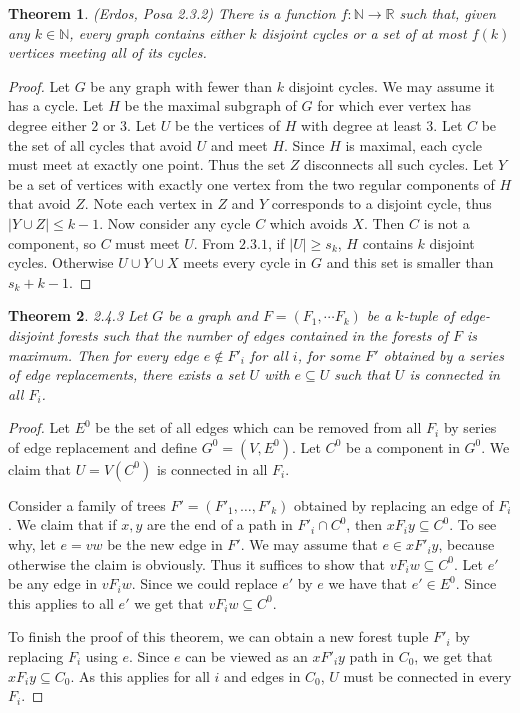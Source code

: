 \documentclass[12pt]{article}
\newtheorem{theorem}{Theorem}
\begin{document}
\begin{theorem} (Erdos, Posa 2.3.2) There is a function
  $f: \mathbb{N} \to \mathbb{R}$ such that, given any
  $k \in \mathbb{N}$, every graph contains either $k$ disjoint cycles
  or a set of at most $f(k)$ vertices meeting all of its cycles.
\end{theorem}
\begin{proof} Let $G$ be any graph with fewer than $k$ disjoint
  cycles. We may assume it has a cycle. Let $H$ be the maximal
  subgraph of $G$ for which ever vertex has degree either $2$ or
  $3$. Let $U$ be the vertices of $H$ with degree at least $3$. Let
  $C$ be the set of all cycles that avoid $U$ and meet $H$. Since $H$
  is maximal, each cycle must meet at exactly one point. Thus the set
  $Z$ disconnects all such cycles. Let $Y$ be a set of vertices with
  exactly one vertex from the two regular components of $H$ that avoid
  $Z$. Note each vertex in $Z$ and $Y$ corresponds to a disjoint
  cycle, thus $|Y \cup Z| \leq k - 1$. Now consider any cycle $C$
  which avoids $X$. Then $C$ is not a component, so $C$ must meet
  $U$. From $2.3.1$, if $|U| \geq s_k$, $H$ contains $k$ disjoint
  cycles. Otherwise $U \cup Y \cup X$ meets every cycle in $G$ and
  this set is smaller than $s_k + k - 1$.
\end{proof}

\begin{theorem}{2.4.3} Let $G$ be a graph and $F = (F_1, \cdots F_k)$
  be a $k$-tuple of edge-disjoint forests such that the number of
  edges contained in the forests of $F$ is maximum. Then for every
  edge $e \notin F'_i$ for all $i$, for some $F'$ obtained by a series
  of edge replacements, there exists a set $U$ with $e \subseteq U$
  such that $U$ is connected in all $F_i$.
\end{theorem}
\begin{proof} Let $E^0$ be the set of all edges which can be removed
  from all $F_i$ by series of edge replacement and define
  $G^0 = (V, E^0)$. Let $C^0$ be a component in $G^0$. We claim that
  $U = V(C^0)$ is connected in all $F_i$.

  Consider a family of trees $F'=(F'_1, \ldots, F'_k)$ obtained by
  replacing an edge of $F_i$. We claim that if $x,y$ are the end of a
  path in $F'_i \cap C^0$, then $x F_i y \subseteq C^0$. To see why,
  let $e = vw$ be the new edge in $F'$. We may assume that
  $e \in x F'_i y$, because otherwise the claim is obviously. Thus it
  suffices to show that $v F_i w \subseteq C^0$. Let $e'$ be any edge
  in $v F_i w$. Since we could replace $e'$ by $e$ we have that
  $e' \in E^0$. Since this applies to all $e'$ we get that
  $vF_i w \subseteq C^0$.

  To finish the proof of this theorem, we can obtain a new forest
  tuple $F'_i$ by replacing $F_i$ using $e$. Since $e$ can be viewed
  as an $xF'_i y$ path in $C_0$, we get that $x F_i y \subseteq
  C_0$. As this applies for all $i$ and edges in $C_0$, $U$ must be
  connected in every $F_i$.
\end{proof}
\end{document}
